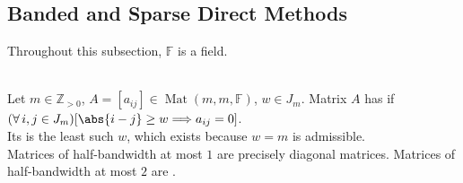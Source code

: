 \subsection{Banded and Sparse Direct Methods}

Throughout this subsection, $\mathbb{F}$ is a field.

\begin{definition} \label{def:band-and-tridiagonal-matrix} \\
Let $m\in\mathbb{Z}_{>0}$, $A=[a_{ij}]\in\operatorname{Mat}(m,m,\mathbb{F})$, $w\in J_m$. Matrix $A$ has  if $(\forall\,i,j\in J_m)[\abs{i-j}\geq w\Longrightarrow a_{ij}=0]$.\\
Its  is the least such $w$, which exists because $w=m$ is admissible.\\
Matrices of half-bandwidth at most $1$ are precisely diagonal matrices. Matrices of half-bandwidth at most $2$ are .
\end{definition}

